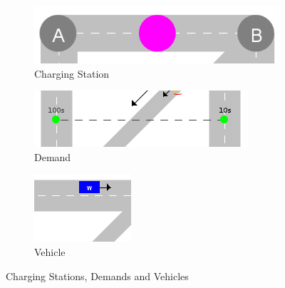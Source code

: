 \documentclass[graybox]{svmult}
\begin{document}
\begin{figure}
	\hfill
	\begin{subfigure}{.3\textwidth}
		\centering
		\includegraphics[scale=0.3]{../../concepts/charge-station.png}
		\caption{Charging Station}
		\label{fig:charging-station}	
	\end{subfigure}
	\hfill
	\begin{subfigure}{.3\textwidth}
		\centering
		\includegraphics[scale=0.5]{../../concepts/demand.png}
		\caption{Demand}
		\label{fig:demand}
	\end{subfigure}
	\hfill
	\begin{subfigure}{.3\textwidth}
		\centering
		\includegraphics[scale=0.7]{../../concepts/vehicle.png}
		\caption{Vehicle}
		\label{fig:vehicle}	
	\end{subfigure}

	\caption{Charging Stations, Demands and Vehicles}
	\label{fig:chargingstations-demands-vehicles}	
\end{figure}
\end{document}
